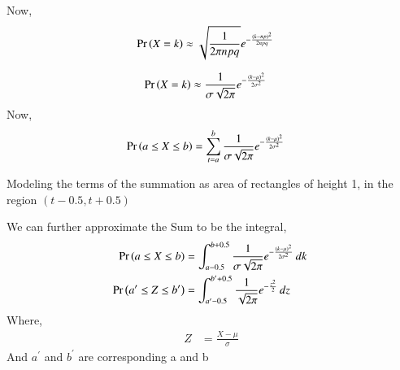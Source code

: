 \documentclass[journal,12pt,twocolumn]{IEEEtran}
\begin{document}
Now,
\begin{align}
    \Pr\left(X=k\right) &\approx \sqrt{\frac{1}{2\pi npq}} e^{-\frac{(k-np)^2}{2npq}}
\end{align}

\begin{align}
    \Pr\left(X=k\right) &\approx \frac{1}{\sigma\sqrt{2\pi}}e^{-\frac{(k-\mu)^2}{2\sigma^2}}
\end{align}
Now,
\begin{align}
    \Pr\left(a \le X \le b\right)&= \sum_{t=a}^b \frac{1}{\sigma\sqrt{2\pi}}e^{-\frac{(k-\mu)^2}{2\sigma^2}}
\end{align}

Modeling the terms of the summation as area of rectangles of height 1, in the region $(t-0.5,t+0.5)$

We can further approximate the Sum to be the integral,
\begin{align}
    \Pr\left(a \le X \le b\right)&= \int_{a-0.5}^{b+0.5} \frac{1}{\sigma\sqrt{2\pi}}e^{-\frac{(k-\mu)^2}{2\sigma^2}}\,dk\ \\
    \Pr\left(a^\prime \le Z \le b^\prime\right)&= \int_{a^\prime-0.5}^{b^\prime+0.5} \frac{1}{\sqrt{2\pi}}e^{-\frac{z^2}{2}}\,dz\
\end{align}
Where,
\begin{align}
    Z &= \frac{X-\mu}{\sigma}
\end{align}
And $a^\prime$ and $b^\prime$ are corresponding a and b
\end{document}
